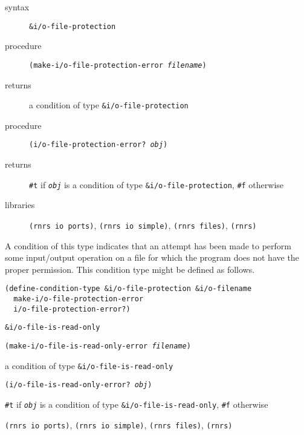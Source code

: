 \begin{description}

\label{exceptions_s37}\item[syntax] \texttt{\&{}i/o-file-protection}



\item[procedure] \texttt{(make-i/o-file-protection-error \textit{filename})}



\item[returns] a condition of type \texttt{\&{}i/o-file-protection}


\item[procedure] \texttt{(i/o-file-protection-error? \textit{obj})}



\item[returns] \texttt{\#{}t} if \texttt{\textit{obj}} is a condition of type \texttt{\&{}i/o-file-protection}, \texttt{\#{}f} otherwise


\item[libraries] \texttt{(rnrs io ports)}, \texttt{(rnrs io simple)}, \texttt{(rnrs files)}, \texttt{(rnrs)}
\end{description}



A condition of this type indicates that an attempt has been made to perform
some input/output operation on a file for which the program does not have the
proper permission.
This condition type might be defined as follows.

\begin{alltt}
(define-condition-type \&{}i/o-file-protection \&{}i/o-filename
  make-i/o-file-protection-error
  i/o-file-protection-error?)
\end{alltt}

\begin{description}

\label{exceptions_s38}\item[syntax] \texttt{\&{}i/o-file-is-read-only}



\item[procedure] \texttt{(make-i/o-file-is-read-only-error \textit{filename})}



\item[returns] a condition of type \texttt{\&{}i/o-file-is-read-only}


\item[procedure] \texttt{(i/o-file-is-read-only-error? \textit{obj})}



\item[returns] \texttt{\#{}t} if \texttt{\textit{obj}} is a condition of type \texttt{\&{}i/o-file-is-read-only}, \texttt{\#{}f} otherwise


\item[libraries] \texttt{(rnrs io ports)}, \texttt{(rnrs io simple)}, \texttt{(rnrs files)}, \texttt{(rnrs)}
\end{description}



